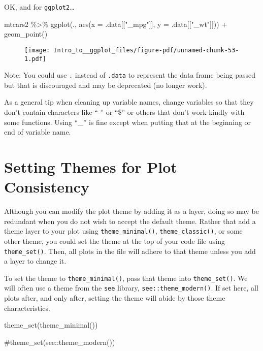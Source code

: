 \documentclass[
  letterpaper,
  DIV=11,
  numbers=noendperiod]{scrartcl}
\newenvironment{Shaded}{\begin{snugshade}}{\end{snugshade}}
\newcommand{\AttributeTok}[1]{\textcolor[rgb]{0.40,0.45,0.13}{#1}}
\newcommand{\CommentTok}[1]{\textcolor[rgb]{0.37,0.37,0.37}{#1}}
\newcommand{\FunctionTok}[1]{\textcolor[rgb]{0.28,0.35,0.67}{#1}}
\newcommand{\NormalTok}[1]{\textcolor[rgb]{0.00,0.23,0.31}{#1}}
\newcommand{\SpecialCharTok}[1]{\textcolor[rgb]{0.37,0.37,0.37}{#1}}
\newcommand{\StringTok}[1]{\textcolor[rgb]{0.13,0.47,0.30}{#1}}
\begin{document}
OK, and for \texttt{ggplot2}\ldots{}

\begin{Shaded}
\begin{Highlighting}[]
\NormalTok{mtcars2 }\SpecialCharTok{\%\textgreater{}\%}
    \FunctionTok{ggplot}\NormalTok{(., }
       \FunctionTok{aes}\NormalTok{(}\AttributeTok{x =}\NormalTok{ .data[[}\StringTok{"\_mpg"}\NormalTok{]], }\AttributeTok{y =}\NormalTok{ .data[[}\StringTok{"\_wt"}\NormalTok{]])) }\SpecialCharTok{+} \FunctionTok{geom\_point}\NormalTok{()}
\end{Highlighting}
\end{Shaded}

\begin{figure}[H]

{\centering \texttt{[image: Intro\_to\_\_ggplot\_files/figure-pdf/unnamed-chunk-53-1.pdf]}

}

\end{figure}

Note: You could use \texttt{.} instead of \texttt{.data} to represent
the data frame being passed but that is discouraged and may be
deprecated (no longer work).

As a general tip when cleaning up variable names, change variables so
that they don't contain characters like ``-'' or ``\$'' or others that
don't work kindly with some functions. Using ``\_'' is fine except when
putting that at the beginning or end of variable name.

\hypertarget{setting-themes-for-plot-consistency}{%
\section{\texorpdfstring{\textbf{Setting Themes for Plot
Consistency}}{Setting Themes for Plot Consistency}}\label{setting-themes-for-plot-consistency}}

Although you can modify the plot theme by adding it as a layer, doing so
may be redundant when you do not wish to accept the default theme.
Rather that add a theme layer to your plot using
\texttt{theme\_minimal()}, \texttt{theme\_classic()}, or some other
theme, you could set the theme at the top of your code file using
\texttt{theme\_set()}. Then, all plots in the file will adhere to that
theme unless you add a layer to change it.

To set the theme to \texttt{theme\_minimal()}, pass that theme into
\texttt{theme\_set()}. We will often use a theme from the \texttt{see}
library, \texttt{see::theme\_modern()}. If set here, all plots after,
and only after, setting the theme will abide by those theme
characteristics.

\begin{Shaded}
\begin{Highlighting}[]
\FunctionTok{theme\_set}\NormalTok{(}\FunctionTok{theme\_minimal}\NormalTok{())}

\CommentTok{\#theme\_set(see::theme\_modern())}
\end{Highlighting}
\end{Shaded}
\end{document}
